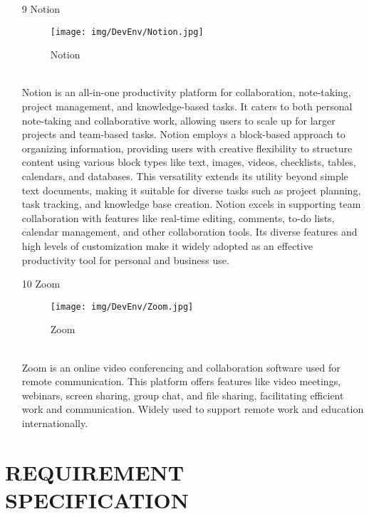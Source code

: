 \documentclass[conference]{IEEEtran}
\begin{document}
\begin{enumerate}
\item[9] Notion
\begin{figure}[h]
\centering
\texttt{[image: img/DevEnv/Notion.jpg]}
\caption{Notion} 
\end{figure}\\
Notion is an all-in-one productivity platform for collaboration, note-taking, project management, and knowledge-based tasks. It caters to both personal note-taking and collaborative work, allowing users to scale up for larger projects and team-based tasks. Notion employs a block-based approach to organizing information, providing users with creative flexibility to structure content using various block types like text, images, videos, checklists, tables, calendars, and databases. This versatility extends its utility beyond simple text documents, making it suitable for diverse tasks such as project planning, task tracking, and knowledge base creation. Notion excels in supporting team collaboration with features like real-time editing, comments, to-do lists, calendar management, and other collaboration tools. Its diverse features and high levels of customization make it widely adopted as an effective productivity tool for personal and business use.\\

\item[10] Zoom
\begin{figure}[h]
\centering
\texttt{[image: img/DevEnv/Zoom.jpg]}
\caption{Zoom} 
\end{figure}\\Zoom is an online video conferencing and collaboration software used for remote communication. This platform offers features like video meetings, webinars, screen sharing, group chat, and file sharing, facilitating efficient work and communication. Widely used to support remote work and education internationally.\\
\end{enumerate}



\section{REQUIREMENT SPECIFICATION}
\end{document}
